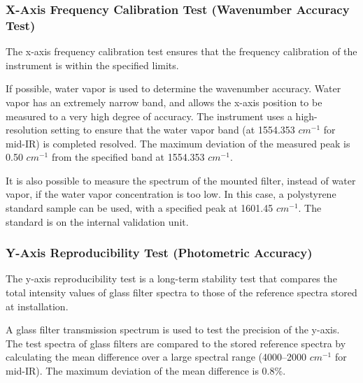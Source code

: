 \subsubsection{X-Axis Frequency Calibration Test (Wavenumber Accuracy Test)}
The x-axis frequency calibration test ensures that the frequency calibration of the instrument is within the specified limits.

If possible, water vapor is used to determine the wavenumber accuracy. Water vapor has an extremely narrow band, and allows the x-axis position to be measured to a very high degree of accuracy. The instrument uses a high-resolution setting to ensure that the water vapor band (at 1554.353 $cm^{-1}$ for mid-IR) is completed resolved. The maximum deviation of the measured peak is 0.50 $cm^{-1}$ from the specified band at 1554.353 $cm^{-1}$.

It is also possible to measure the spectrum of the mounted filter, instead of water vapor, if the water vapor concentration is too low. In this case, a polystyrene standard sample can be used, with a specified peak at 1601.45 $cm^{-1}$. The standard is on the internal validation unit.

\subsubsection{Y-Axis Reproducibility Test (Photometric Accuracy)}
The y-axis reproducibility test is a long-term stability test that compares the total intensity values of glass filter spectra to those of the reference spectra stored at installation.

A glass filter transmission spectrum is used to test the precision of the y-axis. The test spectra of glass filters are compared to the stored reference spectra by calculating the mean difference over a large spectral range (4000--2000 $cm^{-1}$ for mid-IR). The maximum deviation of the mean difference is 0.8\%.

